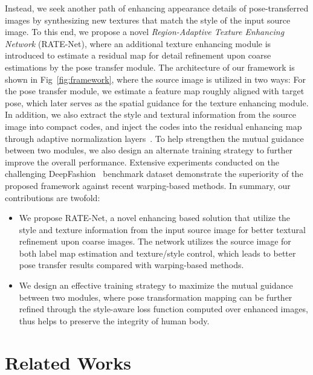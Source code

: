 \documentclass{article}
\begin{document}
Instead, we seek another path of enhancing appearance details of pose-transferred images by synthesizing new textures that match the style of the input source image. To this end, we propose a novel \emph{Region-Adaptive Texture Enhancing Network} (RATE-Net), where an additional texture enhancing module is introduced to estimate a residual map for detail refinement upon coarse estimations by the pose transfer module. The architecture of our framework is shown in Fig~\ref{fig:framework}, where the source image is utilized in two ways: For the pose transfer module, we estimate a feature map roughly aligned with target pose, which later serves as the spatial guidance for the texture enhancing module. In addition, we also extract the style and textural information from the source image into compact codes, and inject the codes into the residual enhancing map through adaptive normalization layers~\cite{adain}. To help strengthen the mutual guidance between two modules, we also design an alternate training strategy to further improve the overall performance. Extensive experiments conducted on the challenging DeepFashion~\cite{DeepFashion} benchmark dataset demonstrate the superiority of the proposed framework against recent warping-based methods. In summary, our contributions are twofold:

\begin{itemize}
  \item We propose RATE-Net, a novel enhancing based solution that utilize the style and texture information from the input source image for better textural refinement upon coarse images. The network utilizes the source image for both label map estimation and texture/style control, which leads to better pose transfer results compared with warping-based methods.
  \item We design an effective training strategy to maximize the mutual guidance between two modules, where pose transformation mapping can be further refined through the style-aware loss function computed over enhanced images, thus helps to preserve the integrity of human body.
\end{itemize}


\section{Related Works}
\end{document}
